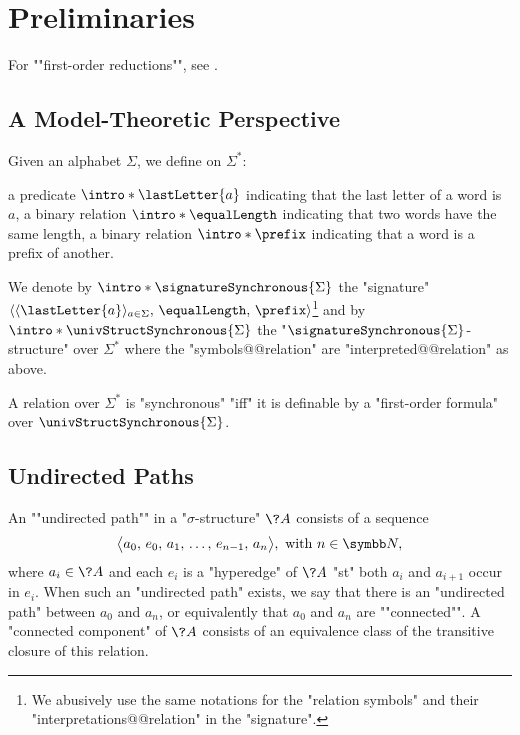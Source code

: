 \section{Preliminaries}

For \AP""first-order reductions"", see
\cite[Definition 2.11 \& Definition 1.26]{Immerman1998DescriptiveComplexity}.

\subsection{A Model-Theoretic Perspective}

Given an alphabet $\Sigma$, we define on $\Sigma^*$:
\begin{itemize}
	\itemAP a predicate $\intro*\lastLetter{a}$ indicating that the last letter of a word is $a$,
	\itemAP a binary relation $\intro*\equalLength$ indicating that two words have the same length,
	\itemAP a binary relation $\intro*\prefix$ indicating that a word is a prefix of another.
\end{itemize} 
We denote by $\intro*\signatureSynchronous{\Sigma}$ the "signature" $\langle \langle\lastLetter{a}\rangle_{a \in \Sigma},\, \equalLength,\, \prefix \rangle$\footnote{We abusively use the same notations for
the "relation symbols" and their "interpretations@@relation" in the "signature".} and
by \AP$\intro*\univStructSynchronous{\Sigma}$ the "$\signatureSynchronous{\Sigma}$-structure" over $\Sigma^*$ where
the "symbols@@relation" are "interpreted@@relation" as above.

\begin{proposition}
	\label{prop:synchronous-first-order}
	A relation over $\Sigma^*$ is "synchronous" "iff" it is definable by a "first-order formula" over \(\univStructSynchronous{\Sigma}\).
\end{proposition}

\subsection{Undirected Paths}

An \AP""undirected path"" in a "$\sigma$-structure" $\?A$ consists of a sequence
\[\big\langle a_0,\, e_0,\, a_1,\, \hdots,\, e_{n-1},\, a_n\big\rangle, \text{ with } n \in \N,\]
where $a_i \in \?A$ and each $e_i$ is a "hyperedge" of $\?A$ "st" both
$a_i$ and $a_{i+1}$ occur in $e_i$. When such an "undirected path" exists, we say that
there is an "undirected path" between $a_0$ and $a_n$, or equivalently
that $a_0$ and $a_n$ are \AP""connected"". A \AP"connected component" of $\?A$ consists of an equivalence class of the 
transitive closure of this relation.

